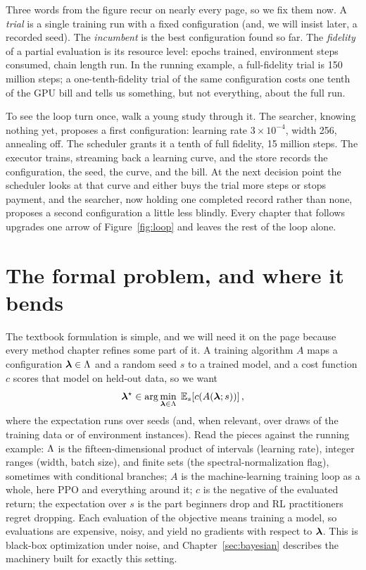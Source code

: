 Three words from the figure recur on nearly every page, so we fix them now.
A \emph{trial} is a single training run with a fixed configuration (and, we
will insist later, a recorded seed). The \emph{incumbent} is the best
configuration found so far. The \emph{fidelity} of a partial evaluation is
its resource level: epochs trained, environment steps consumed, chain length
run. In the running example, a full-fidelity trial is 150 million steps; a
one-tenth-fidelity trial of the same configuration costs one tenth of the
GPU bill and tells us something, but not everything, about the full run.

To see the loop turn once, walk a young study through it. The searcher,
knowing nothing yet, proposes a first configuration: learning rate
$3 \times 10^{-4}$, width 256, annealing off. The scheduler grants
it a tenth of full fidelity, 15 million steps. The executor trains,
streaming back a learning curve, and the store records the
configuration, the seed, the curve, and the bill. At the next decision
point the scheduler looks at that curve and either buys the trial more
steps or stops payment, and the searcher, now holding one completed
record rather than none, proposes a second configuration a little less
blindly. Every chapter that follows upgrades one arrow of
Figure~\ref{fig:loop} and leaves the rest of the loop alone.

\section{The formal problem, and where it bends}
\label{sec:formal}

The textbook formulation is simple, and we will need it on the page because
every method chapter refines some part of it. A training algorithm $A$ maps a
configuration $\bm{\lambda} \in \Lambda$ and a random seed $s$ to a trained model,
and a cost function $c$ scores that model on held-out data, so we want
\begin{equation}
\bm{\lambda}^{\star} \in \arg\min_{\bm{\lambda} \in \Lambda}
\; \mathbb{E}_{s}\!\left[ c\!\left( A(\bm{\lambda}; s) \right) \right],
\label{eq:hpo}
\end{equation}
where the expectation runs over seeds (and, when relevant, over draws of the
training data or of environment instances). Read the pieces against the
running example: $\Lambda$ is the fifteen-dimensional product of intervals
(learning rate), integer ranges (width, batch size), and finite sets (the
spectral-normalization flag), sometimes with conditional branches; $A$ is
the machine-learning training loop as a whole, here PPO and everything
around it; $c$ is the negative of the evaluated return; the expectation
over $s$ is the part beginners drop and RL practitioners regret dropping.
Each evaluation of the objective means training a model, so evaluations are
expensive, noisy, and yield no gradients with respect to $\bm{\lambda}$. This is
black-box optimization under noise, and Chapter~\ref{sec:bayesian} describes
the machinery built for exactly this setting.

